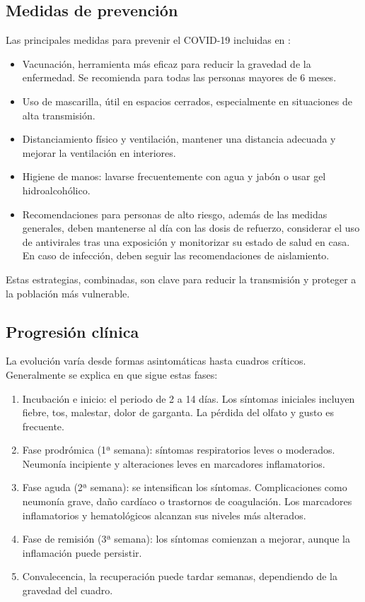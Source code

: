 \begin{enumerate}
\subsection{Medidas de prevención}
Las principales medidas para prevenir el COVID-19 incluidas en \cite{hutchins2020covid}:
\begin{itemize}
    \item Vacunación, herramienta más eficaz para reducir la gravedad de la enfermedad. Se recomienda para todas las personas mayores de 6 meses.
    \item Uso de mascarilla, útil en espacios cerrados, especialmente en situaciones de alta transmisión.
    \item Distanciamiento físico y ventilación, mantener una distancia adecuada y mejorar la ventilación en interiores.
    \item Higiene de manos: lavarse frecuentemente con agua y jabón o usar gel hidroalcohólico.
    \item Recomendaciones para personas de alto riesgo, además de las medidas generales, deben mantenerse al día con las dosis de refuerzo, considerar el uso de antivirales tras una exposición y monitorizar su estado de salud en casa. En caso de infección, deben seguir las recomendaciones de aislamiento.
\end{itemize} 
Estas estrategias, combinadas, son clave para reducir la transmisión y proteger a la población más vulnerable.

\subsection{Progresión clínica}
La evolución varía desde formas asintomáticas hasta cuadros críticos. Generalmente se explica en \cite{cdc_covid19_yellowbook} que sigue estas fases:

\begin{enumerate}
    \item Incubación e inicio: el periodo de 2 a 14 días. Los síntomas iniciales incluyen fiebre, tos, malestar, dolor de garganta. La pérdida del olfato y gusto es frecuente.
    \item Fase prodrómica (1ª semana): síntomas respiratorios leves o moderados. Neumonía incipiente y alteraciones leves en marcadores inflamatorios.
    \item Fase aguda (2ª semana): se intensifican los síntomas. Complicaciones como neumonía grave, daño cardíaco o trastornos de coagulación. Los marcadores inflamatorios y hematológicos alcanzan sus niveles más alterados.
    \item Fase de remisión (3ª semana): los síntomas comienzan a mejorar, aunque la inflamación puede persistir.
    \item Convalecencia, la recuperación puede tardar semanas, dependiendo de la gravedad del cuadro.
\end{enumerate}


\end{enumerate}
